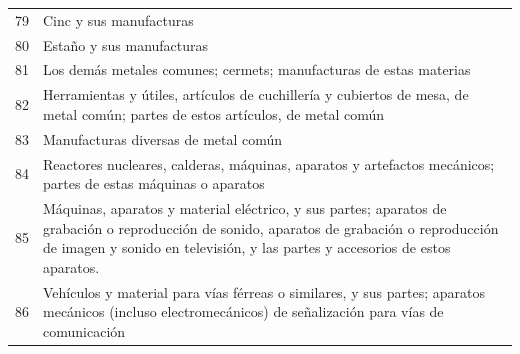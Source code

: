\documentclass[a4paper,openright,12pt]{book}
\begin{document}
\begin{table}[]
{\begin{tabular}{@{}ll@{}}
79  & Cinc y sus manufacturas                                                                                                                                                                                                                                                                        \\
80  & Estaño y sus manufacturas                                                                                                                                                                                                                                                                      \\
81  & Los demás metales comunes; cermets; manufacturas de estas materias                                                                                                                                                                                                                             \\
82  & Herramientas y útiles, artículos de cuchillería y cubiertos de mesa, de metal común; partes de estos artículos, de metal común                                                                                                                                                                 \\
83  & Manufacturas diversas de metal común                                                                                                                                                                                                                                                           \\
84  & Reactores nucleares, calderas, máquinas, aparatos y artefactos mecánicos; partes de estas máquinas o aparatos                                                                                                                                                                                  \\
85  & Máquinas, aparatos y material eléctrico, y sus partes; aparatos de grabación o reproducción de sonido, aparatos de grabación o reproducción de imagen y sonido en televisión, y las partes y accesorios de estos aparatos.                                                                     \\
86  & Vehículos y material para vías férreas o similares, y sus partes; aparatos mecánicos (incluso electromecánicos) de señalización para vías de comunicación                                                                                                                                      \\

\end{tabular}}
\end{table}
\end{document}
